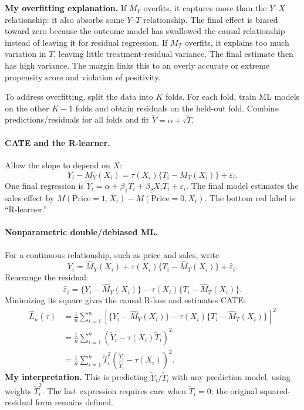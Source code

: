 \textbf{My overfitting explanation.} If $M_Y$ overfits, it captures more than the $Y$--$X$ relationship: it also absorbs some $Y$--$T$ relationship. The final effect is biased toward zero because the outcome model has swallowed the causal relationship instead of leaving it for residual regression. If $M_T$ overfits, it explains too much variation in $T$, leaving little treatment-residual variance. The final estimate then has high variance. The margin links this to an overly accurate or extreme propensity score and violation of positivity.

To address overfitting, split the data into $K$ folds. For each fold, train ML models on the other $K-1$ folds and obtain residuals on the held-out fold. Combine predictions/residuals for all folds and fit $\widetilde Y=\alpha+\tau\widetilde T$.

\paragraph{CATE and the R-learner.}
Allow the slope to depend on $X$:
\[Y_i-M_Y(X_i)=\tau(X_i)\{T_i-M_T(X_i)\}+\varepsilon_i.\]
One final regression is $\widetilde Y_i=\alpha+\beta_1\widetilde T_i+\beta_2X_i\widetilde T_i+\varepsilon_i$. The final model estimates the sales effect by $M(\mathrm{Price}=1,X_i)-M(\mathrm{Price}=0,X_i)$. The bottom red label is ``R-learner.''

\paragraph{Nonparametric double/debiased ML.}
For a continuous relationship, such as price and sales, write
\[Y_i=\hat M_Y(X_i)+\tau(X_i)\{T_i-\hat M_T(X_i)\}+\hat\varepsilon_i.\]
Rearrange the residual:
\[\hat\varepsilon_i=\{Y_i-\hat M_Y(X_i)\}-\tau(X_i)\{T_i-\hat M_T(X_i)\}.\]
Minimizing its square gives the causal R-loss and estimates CATE:
\begin{align*}
\hat L_n(\tau)&=\frac1n\sum_{i=1}^n\left[\{Y_i-\hat M_Y(X_i)\}-\tau(X_i)\{T_i-\hat M_T(X_i)\}\right]^2\\
&=\frac1n\sum_{i=1}^n(\widetilde Y_i-\tau(X_i)\widetilde T_i)^2\\
&=\frac1n\sum_{i=1}^n\widetilde T_i^2\left(\frac{\widetilde Y_i}{\widetilde T_i}-\tau(X_i)\right)^2.
\end{align*}
\textbf{My interpretation.} This is predicting $\widetilde Y_i/\widetilde T_i$ with any prediction model, using weights $\widetilde T_i^2$. The last expression requires care when $\widetilde T_i=0$; the original squared-residual form remains defined.

